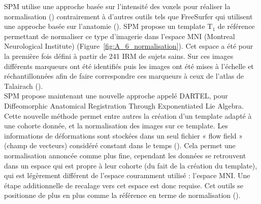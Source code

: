 SPM utilise une approche basée sur l’intensité des voxels pour réaliser la normalisation (\cite{Ashburner2003})
contrairement à d’autres outils tels que FreeSurfer qui utilisent une approche basée sur l’anatomie
(\cite{Buckner2004}). SPM propose un template T$_1$ de référence permettant de normaliser ce type d’imagerie dans
l’espace MNI (Montreal Neurological Institute) (Figure~\ref{fig:A_6_normalisation}). Cet espace a été pour la première fois
défini à partir de 241 IRM de sujets sains. Sur ces images différents marqueurs ont été identifiés puis
les images ont été mises à l’échelle et réchantillonnées afin de faire correspondre ces marqueurs à
ceux de l’atlas de Talairach (\cite{Collins1995}).\\
SPM propose maintenant une nouvelle approche appelé DARTEL, pour Diffeomorphic
Anatomical Registration Through Exponentiated Lie Algebra. Cette nouvelle méthode permet entre
autres la création d’un template adapté à une cohorte donnée, et la normalisation des images sur ce
template. Les informations de déformations sont stockées dans un seul fichier « flow field » (champ de vecteurs) considéré constant dans le temps (\cite{Ashburner2007}). Cela permet une normalisation annoncée comme
plus fine, cependant les données se retrouvent dans un espace qui est propre à leur cohorte (du fait
de la création du template), qui est légèrement différent de l’espace couramment utilisé : l’espace
MNI. Une étape additionnelle de recalage vers cet espace est donc requise. Cet outils se positionne de
plus en plus comme la référence en terme de normalisation (\cite{Klein2009}).

